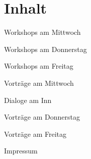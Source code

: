 \section*{Inhalt}

\vspace*{0.35em}%
\noindent Workshops am Mittwoch \dotfill \pageref{mittwoch-workshops}

\vspace*{0.35em}%
\noindent Workshops am Donnerstag \dotfill \pageref{donnerstag-workshops}

\vspace*{0.35em}%
\noindent Workshops am Freitag \dotfill \pageref{freitag-workshops}

\vspace*{0.35em}%
\noindent Vorträge am Mittwoch \dotfill \pageref{mittwoch}

\vspace*{0.35em}%
\noindent Dialoge am Inn \dotfill \pageref{social-event}

\vspace*{0.35em}%
\noindent Vorträge am Donnerstag \dotfill \pageref{donnerstag}

\vspace*{0.35em}%
\noindent Vorträge am Freitag \dotfill \pageref{freitag}

\vspace*{0.35em}%
\noindent Impressum \dotfill \pageref{impressum}

\newpage
